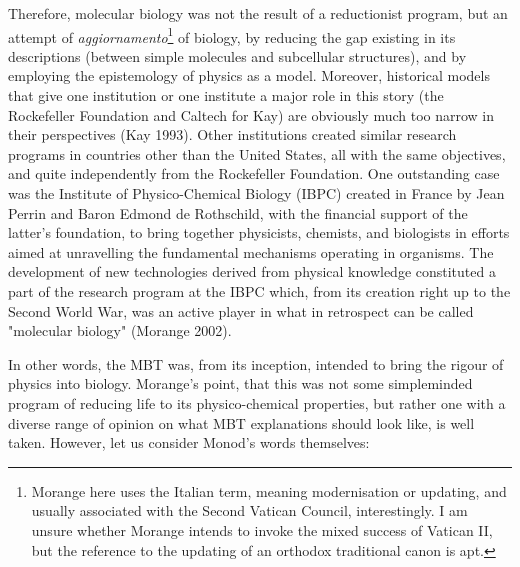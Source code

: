 \begin{longquote}
Therefore, molecular biology was not the result of a reductionist
program, but an attempt of \textit{aggiornamento}\footnote{Morange here uses the Italian term, meaning modernisation or updating, and usually associated with the Second Vatican Council, interestingly. I am unsure whether Morange intends to invoke the mixed success of Vatican II, but the reference to the updating of an orthodox traditional canon is apt.} of biology, by reducing the
gap existing in its descriptions (between simple molecules and subcellular
structures), and by employing the epistemology of physics as a model.
Moreover, historical models that give one institution or one institute a
major role in this story (the Rockefeller Foundation and Caltech for Kay)
are obviously much too narrow in their perspectives (Kay 1993). Other
institutions created similar research programs in countries other than
the United States, all with the same objectives, and quite independently
from the Rockefeller Foundation. One outstanding case was the Institute
of Physico-Chemical Biology (IBPC) created in France by Jean Perrin
and Baron Edmond de Rothschild, with the financial support of the
latter's foundation, to bring together physicists, chemists, and biologists
in efforts aimed at unravelling the fundamental mechanisms operating
in organisms. The development of new technologies derived from
physical knowledge constituted a part of the research program at the
IBPC which, from its creation right up to the Second World War, was
an active player in what in retrospect can be called "molecular biology"
(Morange 2002).
\cite{Morange2008}
\end{longquote}
 
In other words, the MBT was, from its inception, intended to bring the rigour of physics into biology. Morange's point, that this was not some simpleminded program of reducing life to its physico-chemical properties, but rather one with a diverse range of opinion on what MBT explanations should look like, is well taken. However, let us consider Monod's words themselves:

